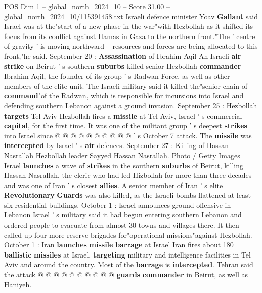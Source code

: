 \begin{textsample}{POS Dim 1 – global\_north\_2024\_10 – Score 31.00 – global\_north\_2024\_10/115391458.txt}
Israeli defence minister Yoav \textbf{Gallant} said Israel was at the"start of a new phase in the war"with Hezbollah as it shifted its focus from its conflict against Hamas in Gaza to the northern front."The ' centre of gravity ' is moving northward -- resources and forces are being allocated to this front,"he said.
September 20 : \textbf{Assassination} of Ibrahim Aqil An Israeli \textbf{air} \textbf{strike} on Beirut ' s southern \textbf{suburbs} killed senior Hezbollah \textbf{commander} Ibrahim Aqil, the founder of its group ' s Radwan Force, as well as other members of the elite unit.
The Israeli military said it killed the"senior chain of \textbf{command}"of the Radwan, which is responsible for incursions into Israel and defending southern Lebanon against a ground invasion.
September 25 : Hezbollah \textbf{targets} Tel Aviv Hezbollah fires a \textbf{missile} at Tel Aviv, Israel ' s commercial \textbf{capital}, for the first time.
It was one of the militant group ' s deepest \textbf{strikes} into Israel since @ @ @ @ @ @ @ @ @ @ ' s October 7 attack.
The \textbf{missile} was \textbf{intercepted} by Israel ' s \textbf{air} defences.
September 27 : Killing of Hassan Nasrallah Hezbollah leader Sayyed Hassan Nasrallah.
Photo / Getty Images Israel \textbf{launches} a wave of \textbf{strikes} in the southern \textbf{suburbs} of Beirut, killing Hassan Nasrallah, the cleric who had led Hizbollah for more than three decades and was one of Iran ' s closest \textbf{allies}.
A senior member of Iran ' s elite \textbf{Revolutionary} \textbf{Guards} was also killed, as the Israeli bombs flattened at least six residential buildings.
October 1 : Israel announces ground offensive in Lebanon Israel ' s military said it had begun entering southern Lebanon and ordered people to evacuate from almost 30 towns and villages there.
It then called up four more reserve brigades for"operational missions"against Hezbollah.
October 1 : Iran \textbf{launches} \textbf{missile} \textbf{barrage} at Israel Iran fires about 180 \textbf{ballistic} \textbf{missiles} at Israel, \textbf{targeting} military and intelligence facilities in Tel Aviv and around the country.
Most of the \textbf{barrage} is \textbf{intercepted}.
Tehran said the attack @ @ @ @ @ @ @ @ @ @ \textbf{guards} \textbf{commander} in Beirut, as well as Haniyeh.

\end{textsample}
